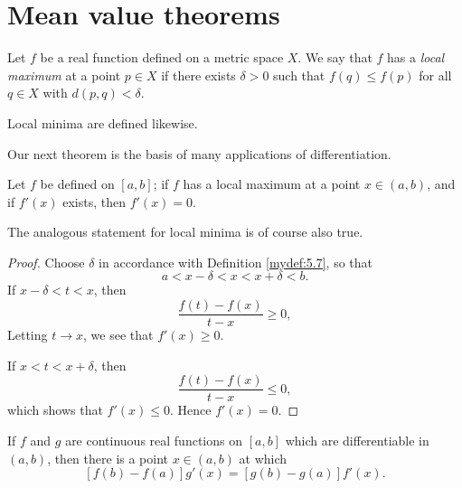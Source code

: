 \section{Mean value theorems}
\begin{mydef}
    \label{mydef:5.7}
    Let $f$ be a real function defined on a metric space $X$.
    We say that $f$ has a \emph{local maximum} at a point $p \in X$ 
    if there exists $\delta > 0$ 
    such that $f(q) \leq f(p)$ 
    for all $q \in X$ with $d(p, q) < \delta$.
\end{mydef}
Local minima are defined likewise.

Our next theorem is the basis of many applications of differentiation.
\begin{thm}
    \label{thm:5.8}
    Let $f$ be defined on $[a, b]$;
    if $f$ has a local maximum at a point $x \in (a, b)$, 
    and if $f'(x)$ exists, then $f'(x) = 0$.
\end{thm}

The analogous statement for local minima is of course also true.
\begin{proof}
    Choose $\delta$ in accordance with Definition \ref{mydef:5.7}, 
    so that
    \begin{equation*}
        a < x - \delta < x < x + \delta < b.
    \end{equation*}
    If $x - \delta < t < x$, then
    \begin{equation*}
        \frac{f(t)-f(x)}{t-x} \geq 0,
    \end{equation*}
    Letting $t \rightarrow x$, we see that $f'(x) \geq 0$.
    
    If $x < t < x + \delta$, then 
    \begin{equation*}
        \frac{f(t) -f(x)}{t-x} \leq 0,
    \end{equation*}
    which shows that $f'(x) \leq 0$. Hence $f'(x) = 0$.
\end{proof}

\begin{thm}
    \label{thm:5.9}
    If $f$ and $g$ are continuous real functions on $[a, b]$ 
    which are differentiable in $(a, b)$, 
    then there is a point $x \in (a, b)$ at which
    \begin{equation*}
        \left[ f(b) - f(a) \right]g'(x) = 
        \left[ g(b) - g(a) \right]f'(x).
    \end{equation*}
\end{thm}

